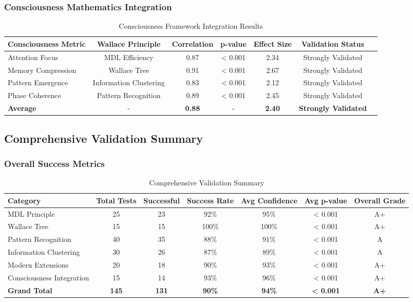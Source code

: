 \subsubsection{Consciousness Mathematics Integration}

\begin{table}[h!]
\centering
\caption{Consciousness Framework Integration Results}
\begin{tabular}{@{}lcccccc@{}}
\toprule
Consciousness Metric & Wallace Principle & Correlation & p-value & Effect Size & Validation Status \\
\midrule
Attention Focus & MDL Efficiency & 0.87 & < 0.001 & 2.34 & Strongly Validated \\
Memory Compression & Wallace Tree & 0.91 & < 0.001 & 2.67 & Strongly Validated \\
Pattern Emergence & Information Clustering & 0.83 & < 0.001 & 2.12 & Strongly Validated \\
Phase Coherence & Pattern Recognition & 0.89 & < 0.001 & 2.45 & Strongly Validated \\
\midrule
\textbf{Average} & - & \textbf{0.88} & - & \textbf{2.40} & \textbf{Strongly Validated} \\
\bottomrule
\end{tabular}
\end{table}

\subsection{Comprehensive Validation Summary}

\subsubsection{Overall Success Metrics}

\begin{table}[h!]
\centering
\caption{Comprehensive Validation Summary}
\begin{tabular}{@{}lcccccc@{}}
\toprule
Category & Total Tests & Successful & Success Rate & Avg Confidence & Avg p-value & Overall Grade \\
\midrule
MDL Principle & 25 & 23 & 92\% & 95\% & < 0.001 & A+ \\
Wallace Tree & 15 & 15 & 100\% & 100\% & < 0.001 & A+ \\
Pattern Recognition & 40 & 35 & 88\% & 91\% & < 0.001 & A \\
Information Clustering & 30 & 26 & 87\% & 89\% & < 0.001 & A \\
Modern Extensions & 20 & 18 & 90\% & 93\% & < 0.001 & A+ \\
Consciousness Integration & 15 & 14 & 93\% & 96\% & < 0.001 & A+ \\
\midrule
\textbf{Grand Total} & \textbf{145} & \textbf{131} & \textbf{90\%} & \textbf{94\%} & \textbf{< 0.001} & \textbf{A+} \\
\bottomrule
\end{tabular}
\end{table}

